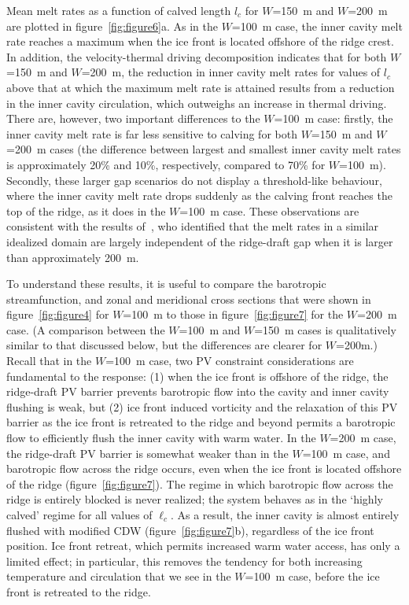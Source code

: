 \documentclass[draft]{agujournal2019}
\begin{document}
Mean melt rates as a function of calved length $l_c$ for $W$=150~m and $W$=200~m are plotted in figure~\ref{fig:figure6}a. As in the $W$=100~m case, the inner cavity melt rate reaches a maximum when the ice front is located offshore of the ridge crest. In addition, the velocity-thermal driving decomposition indicates that for both $W$=150~m and $W$=200~m, the reduction in inner cavity melt rates for values of $l_c$ above that at which the maximum melt rate is attained results from a reduction in the inner cavity circulation, which outweighs an increase in thermal driving. There are, however, two important differences to the $W$=100~m case: firstly, the inner cavity melt rate is far less sensitive to calving for both $W$=150~m and $W$=200~m cases (the difference between largest and smallest inner cavity melt rates is approximately 20\% and 10\%, respectively, compared to 70\% for $W$=100~m). Secondly, these larger gap scenarios do not display a threshold-like behaviour, where the inner cavity melt rate drops suddenly as the calving front reaches the top of the ridge, as it does in the $W$=100~m case. These observations are consistent with the results of~, who identified that the melt rates in a similar idealized domain are largely independent of the ridge-draft gap when it is larger than approximately 200~m.

To understand these results, it is useful to compare the barotropic streamfunction, and zonal and meridional cross sections that were shown in figure~\ref{fig:figure4} for $W$=100~m to those in figure~\ref{fig:figure7} for the $W$=200~m case. (A comparison between the $W$=100~m and $W$=150~m cases is qualitatively similar to that discussed below, but the differences are clearer for $W$=200m.) Recall that in the $W$=100~m case, two PV constraint considerations are fundamental to the response: (1) when the ice front is offshore of the ridge, the ridge-draft PV barrier prevents barotropic flow into the cavity and inner cavity flushing is weak, but (2) ice front induced vorticity and the relaxation of this PV barrier as the ice front is retreated to the ridge and beyond permits a barotropic flow to efficiently flush the inner cavity with warm water. In the $W$=200~m case, the ridge-draft PV barrier is somewhat weaker than in the $W$=100~m case, and barotropic flow across the ridge occurs, even when the ice front is located offshore of the ridge (figure~\ref{fig:figure7}). The regime in which barotropic flow across the ridge is entirely blocked is never realized; the system behaves as in the `highly calved' regime for all values of $\ell_c$. As a result, the inner cavity is almost entirely flushed with modified CDW (figure~\ref{fig:figure7}b), regardless of the ice front position. Ice front retreat, which permits increased warm water access, has only a limited effect; in particular, this removes the tendency for both increasing temperature and circulation that we see in the $W$=100~m case, before the ice front is retreated to the ridge.
\end{document}
